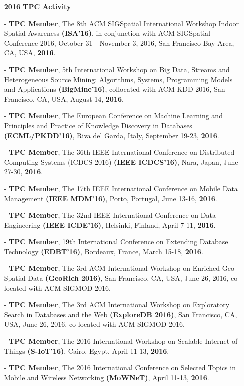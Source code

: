 \documentclass[10pt]{article}
\begin{document}
\begin{itemize}
\begin{itemize}
\vspace{0.1in}
\item[]{\bf 2016 TPC Activity\hrulefill }
%
\item[-] {\bf TPC Member}, The 8th ACM SIGSpatial International Workshop Indoor Spatial Awareness {\bf (ISA'16)}, in conjunction with ACM SIGSpatial Conference 2016, October 31 - November 3, 2016, San Francisco Bay Area, CA, USA, {\bf 2016}.
\item[-] {\bf TPC Member}, 5th International Workshop on Big Data, Streams and Heterogeneous Source Mining: Algorithms, Systems, Programming Models and Applications {\bf (BigMine'16)}, collocated with ACM KDD 2016, San Francisco, CA, USA, August 14, {\bf 2016}.
\item[-] {\bf TPC Member}, The European Conference on Machine Learning and Principles and Practice of Knowledge Discovery in Databases {\bf (ECML/PKDD'16)}, Riva del Garda, Italy, September 19-23, {\bf 2016}.
\item[-] {\bf TPC Member}, The 36th IEEE International Conference on Distributed Computing Systems (ICDCS 2016) {\bf (IEEE ICDCS'16)}, Nara, Japan, June 27-30, {\bf 2016}.
\item[-] {\bf TPC Member}, The 17th IEEE International Conference on Mobile Data Management {\bf (IEEE MDM'16)}, Porto, Portugal, June 13-16, {\bf 2016}.
\item[-] {\bf TPC Member}, The 32nd IEEE International Conference on Data Engineering {\bf (IEEE ICDE'16)}, Helsinki, Finland, April 7-11, {\bf 2016}.
\item[-] {\bf TPC Member}, 19th International Conference on Extending Database Technology {\bf (EDBT'16)},  Bordeaux, France, March 15-18, {\bf 2016}.
\item[-] {\bf TPC Member}, The 3rd ACM International Workshop on Enriched Geo-Spatial Data {\bf (GeoRich 2016)}, San Francisco, CA, USA, June 26, 2016, co-located with ACM SIGMOD 2016.
\item[-] {\bf TPC Member}, The 3rd ACM International Workshop on Exploratory Search in Databases and the Web {\bf (ExploreDB 2016)}, San Francisco, CA, USA, June 26, 2016, co-located with ACM SIGMOD 2016.
\item[-] {\bf TPC Member}, The 2016 International Workshop on Scalable Internet of Things {\bf (S-IoT'16)}, Cairo, Egypt, April 11-13, {\bf 2016}.
\item[-] {\bf TPC Member}, The 2016 International Conference on Selected Topics in Mobile and Wireless Networking {\bf (MoWNeT)}, April 11-13, {\bf 2016}.

\end{itemize}
\end{itemize}
\end{document}
